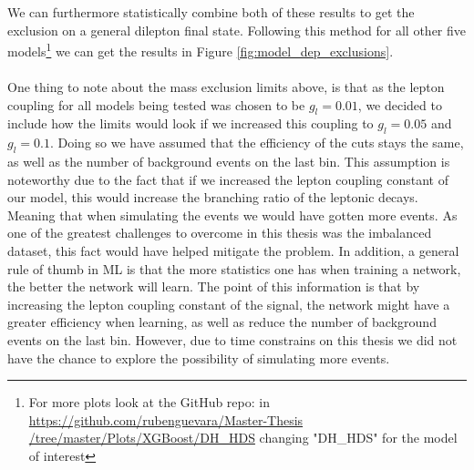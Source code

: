 \documentclass[12pt, a4paper]{book}
\begin{document}
\noindent We can furthermore statistically combine both of these results to get the exclusion on a general dilepton final state. Following this method for all other five models\footnote{For more plots look at the GitHub repo: in \href{https://github.com/rubenguevara/Master-Thesis/tree/master/Plots/XGBoost/DH_HDS}{https://github.com/rubenguevara/Master-Thesis\\/tree/master/Plots/XGBoost/DH\_HDS} changing "DH\_HDS" for the model of interest} 
we can get the results in Figure \ref{fig:model_dep_exclusions}.\\
\\One thing to note about the mass exclusion limits above, is that as the lepton coupling for all models being tested was chosen to be $g_l=0.01$, we decided to include how the limits would look if we increased this coupling 
to $g_l=0.05$ and $g_l=0.1$. Doing so we have assumed that the efficiency of the cuts stays the same, as well as the number of background events on the last bin. This assumption is noteworthy due to the fact that if we increased the lepton coupling constant of our model, this would increase the branching ratio 
of the leptonic decays. Meaning that when simulating the events we would have gotten more events. As one of the greatest challenges to overcome in this thesis was the imbalanced dataset, this fact would have helped mitigate the problem. 
In addition, a general rule of thumb in ML is that the more statistics one has when training a network, the better the network will learn. The point of this information is that by increasing the lepton coupling constant of the signal, the network 
might have a greater efficiency when learning, as well as reduce the number of background events on the last bin. However, due to time constrains on this thesis we did not have the chance to explore the possibility of simulating more events.
\clearpage
\end{document}

